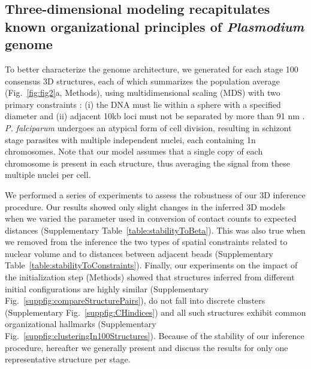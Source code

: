 \subsection*{Three-dimensional modeling recapitulates known organizational principles of {\em Plasmodium} genome}

To better characterize the genome architecture, we generated for each stage 100 consensus 3D structures, each of which summarizes the population average (Fig.~\ref{fig:fig2}a, Methods), using multidimensional scaling (MDS) with two primary constraints \citep{duan:three}: (i) the DNA must lie within a sphere with a specified diameter \citep{bannister:making, weiner:3d} and (ii) adjacent 10kb loci must not be separated by more than 91 nm \citep{bystricky:long-range}. \emph{P. falciparum} undergoes an atypical form of cell division, resulting in schizont stage parasites with multiple independent nuclei, each containing 1n chromosomes. Note that our model assumes that a single copy of each chromosome is present in each structure, thus averaging the signal from these multiple nuclei per cell.


We performed a series of experiments to assess the robustness of our 3D inference procedure.  Our results showed only slight changes in the inferred 3D models when we varied the parameter used in conversion of contact counts to expected distances (Supplementary Table~\ref*{table:stabilityToBeta}). This was also true when we removed from the inference the two types of spatial constraints related to nuclear volume and to distances between adjacent beads (Supplementary Table~\ref*{table:stabilityToConstraints}). Finally, our experiments on the impact of the initialization step (Methods) showed that structures inferred from different initial configurations are highly similar (Supplementary Fig.~\ref*{suppfig:compareStructurePairs}), do not fall into discrete clusters (Supplementary Fig.~\ref*{suppfig:CHindices}) and all such structures exhibit common organizational hallmarks (Supplementary Fig.~\ref*{suppfig:clusteringIn100Structures}). Because of the stability of our inference procedure, hereafter we generally present and discuss the results for only one representative structure per stage.

